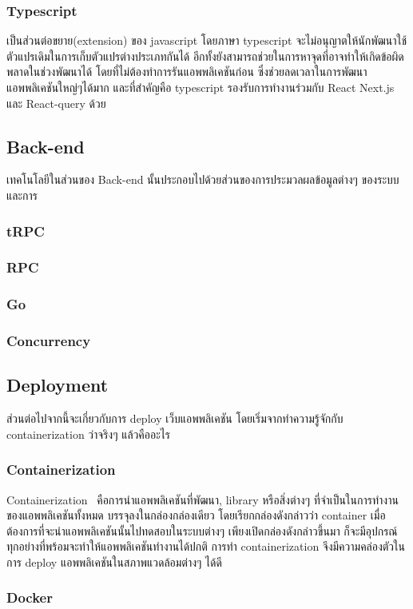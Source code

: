 \subsubsection{Typescript}
เป็นส่วนต่อขยาย(extension) ของ javascript โดยภาษา typescript จะไม่อนุญาตให้นักพัฒนาใช้ตัวแปรเดิมในการเก็บตัวแปรต่างประเภทกันได้
อีกทั้งยังสามารถช่วยในการหาจุดที่อาจทำให้เกิดข้อผิดพลาดในช่วงพัฒนาได้ โดยที่ไม่ต้องทำการรันแอพพลิเคชันก่อน ซึ่งช่วยลดเวลาในการพัฒนาแอพพลิเคชันใหญ่ๆได้มาก
และที่สำคัญคือ typescript รองรับการทำงานร่วมกับ React Next.js และ React-query ด้วย
\subsection{Back-end}
เทคโนโลยีในส่วนของ Back-end นั้นประกอบไปด้วยส่วนของการประมวลผลข้อมูลต่างๆ ของระบบ และการ
\subsubsection{tRPC}
\subsubsection{RPC}
\subsubsection{Go}
\subsubsection{Concurrency}
\subsection{Deployment}
ส่วนต่อไปจากนี้จะเกี่ยวกับการ deploy เว็บแอพพลิเคชัน โดยเริ่มจากทำความรู้จักกับ 
containerization ว่าจริงๆ แล้วคืออะไร
\subsubsection{Containerization}
Containerization~\cite{ctnrh} คือการนำแอพพลิเคชันที่พัฒนา, library หรือสิ่งต่างๆ 
ที่จำเป็นในการทำงานของแอพพลิเคชันทั้งหมด บรรจุลงในกล่องกล่องเดียว โดยเรียกกล่องดังกล่าวว่า container 
เมื่อต้องการที่จะนำแอพพลิเคชันนั้นไปทดสอบในระบบต่างๆ เพียงเปิดกล่องดังกล่าวขึ้นมา
ก็จะมีอุปกรณ์ทุกอย่างที่พร้อมจะทำให้แอพพลิเคชันทำงานได้ปกติ การทำ containerization 
จึงมีความคล่องตัวในการ deploy แอพพลิเคชันในสภาพแวดล้อมต่างๆ ได้ดี 
\subsubsection{Docker}



